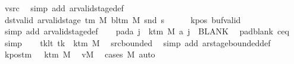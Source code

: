 \begin{isabellebody}
\ vsrc\ \isamarkupfalse%
\ {\isacharparenleft}{\kern0pt}simp\ add{\isacharcolon}{\kern0pt}\ ar{\isacharunderscore}{\kern0pt}valid{\isacharunderscore}{\kern0pt}stage{\isacharunderscore}{\kern0pt}def{\isacharparenright}{\kern0pt}\isanewline
\ \ \isamarkupfalse%
\ dst{\isacharunderscore}{\kern0pt}valid{\isacharcolon}{\kern0pt}\ {\isachardoublequoteopen}ar{\isacharunderscore}{\kern0pt}valid{\isacharunderscore}{\kern0pt}stage\ {\isacharparenleft}{\kern0pt}{\isasymGamma}{\isacharunderscore}{\kern0pt}tm\ M{\isacharparenright}{\kern0pt}\ {\isacharparenleft}{\kern0pt}bl{\isacharunderscore}{\kern0pt}tm\ M{\isacharparenright}{\kern0pt}\ {\isacharparenleft}{\kern0pt}snd\ {\isacharquery}{\kern0pt}s{\isacharprime}{\kern0pt}{\isacharparenright}{\kern0pt}{\isachardoublequoteclose}\isanewline
\ \ \ \ \isamarkupfalse%
\ kpos\ buf{\isacharunderscore}{\kern0pt}valid\ \isamarkupfalse%
\ {\isacharparenleft}{\kern0pt}simp\ add{\isacharcolon}{\kern0pt}\ ar{\isacharunderscore}{\kern0pt}valid{\isacharunderscore}{\kern0pt}stage{\isacharunderscore}{\kern0pt}def{\isacharparenright}{\kern0pt}\isanewline
\ \ \isamarkupfalse%
\ pad{\isacharunderscore}{\kern0pt}a{\isacharcolon}{\kern0pt}\ {\isachardoublequoteopen}{\isasymforall}j\ {\isasymge}\ k{\isacharunderscore}{\kern0pt}tm\ M{\isachardot}{\kern0pt}\ {\isacharquery}{\kern0pt}a\ j\ {\isacharequal}{\kern0pt}\ BLANK{}{\isachardoublequoteclose}\ \isamarkupfalse%
\ pad{\isacharunderscore}{\kern0pt}blank\ c{\isacharprime}{\kern0pt}{\isacharunderscore}{\kern0pt}eq\ \isamarkupfalse%
\ simp\isanewline
\ \ \isamarkupfalse%
\ tk{\isacharunderscore}{\kern0pt}lt{\isacharcolon}{\kern0pt}\ {\isachardoublequoteopen}tk\ {\isacharless}{\kern0pt}\ k{\isacharunderscore}{\kern0pt}tm\ M{\isachardoublequoteclose}\ \isamarkupfalse%
\ src{\isacharunderscore}{\kern0pt}bounded\ \isamarkupfalse%
\ {\isacharparenleft}{\kern0pt}simp\ add{\isacharcolon}{\kern0pt}\ ar{\isacharunderscore}{\kern0pt}stage{\isacharunderscore}{\kern0pt}bounded{\isacharunderscore}{\kern0pt}def{\isacharparenright}{\kern0pt}\isanewline
\ \ \isamarkupfalse%
\ kpos{\isacharunderscore}{\kern0pt}tm{\isacharcolon}{\kern0pt}\ {\isachardoublequoteopen}{}\ {\isacharless}{\kern0pt}\ k{\isacharunderscore}{\kern0pt}tm\ M{\isachardoublequoteclose}\ \isamarkupfalse%
\ vM\ \isamarkupfalse%
\ {\isacharparenleft}{\kern0pt}cases\ M{\isacharparenright}{\kern0pt}\ auto\isanewline

\end{isabellebody}
